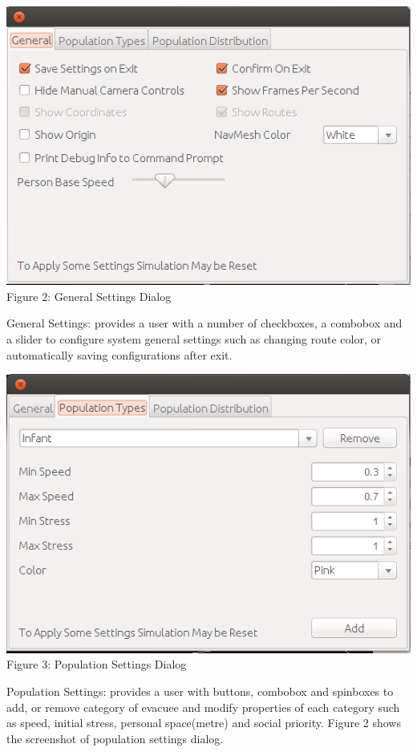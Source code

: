 \documentclass[a4paper,10pt]{article}
\begin{document}
\begin{center}
\includegraphics[scale=0.5]{generalsettings.png}
\\Figure 2: General Settings Dialog
\end{center}
General Settings: provides a user with a number of checkboxes, a combobox and a slider to configure system general settings such as changing 
route color, or automatically saving configurations after exit.
\\
\begin{center}
\includegraphics[scale=0.5]{populationSettingsGUI.png}
\\Figure 3: Population Settings Dialog
\end{center}

Population Settings: provides a user with buttons, combobox and spinboxes to add, or remove category of evacuee and modify properties of each category
such as speed, initial stress, personal space(metre) and social priority. Figure 2 shows the screenshot of population settings dialog.
\end{document}
